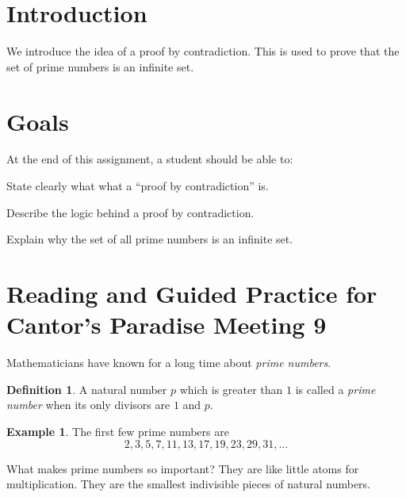 \documentclass[12pt,letterpaper]{article}
\theoremstyle{definition}
\newtheorem{example}{Example}
\newtheorem*{definition}{Definition}
\begin{document}
\setlength{\parskip}{1ex plus 0.5ex minus 0.2ex}
\setlength{\parindent}{0pt}

\pagestyle{fancy}
\cfoot{}

\section*{Introduction}
We introduce the idea of a proof by contradiction.
This is used to prove that the set of prime numbers is an infinite set.

\section*{Goals}
At the end of this assignment, a student should be able to:
\begin{compactitem}
\item State clearly what what a ``proof by contradiction'' is.
\item Describe the logic behind a proof by contradiction.
\item Explain why the set of all prime numbers is an infinite set.
\end{compactitem}


\section*{Reading and Guided Practice for Cantor's Paradise Meeting 9}

Mathematicians have known for a long time about \emph{prime numbers}.

\begin{definition} 
A natural number $p$ which is greater than $1$ is called a \emph{prime number} when its only divisors are $1$ and $p$.
\end{definition}

\begin{example}
The first few prime numbers are 
\[2, 3, 5, 7, 11, 13, 17, 19, 23, 29, 31, \ldots\]
\end{example}

What makes prime numbers so important?
They are like little atoms for multiplication.
They are the smallest indivisible pieces of natural numbers.
\end{document}
